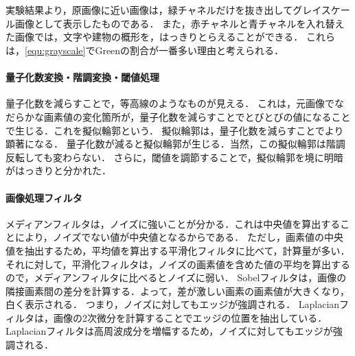 \section{\consideration}
\paragraph{\kadaiaa}
実験結果より，原画像に近い画像は，緑チャネルだけを抜き出してグレイスケール画像として表示したものである．
また，赤チャネルと青チャネルを入れ替えた画像では，文字や建物の概形を，はっきりとらえることができる．
これらは，\eqref{equ:grayscale}でGreenの割合が一番多い理由と考えられる．
\paragraph{量子化数変換・階調変換・閾値処理}
量子化数を減らすことで，等高線のようなものが見える．
これは，元画像でなだらかな画素値の変化箇所が，量子化数を減らすことでとびとびの値になることで生じる．これを擬似輪郭という．
擬似輪郭は，量子化数を減らすことでより顕著になる．
量子化数が減ると擬似輪郭が生じる．当然，この擬似輪郭は階調反転しても変わらない．
さらに，閾値を調節することで，擬似輪郭を境に明暗がはっきりと分かれた．
\paragraph{画像処理フィルタ}
メディアンフィルタは，ノイズに強いことが分かる．これは中央値を算出することにより，ノイズでない値が中央値となるからである．
ただし，画素値の中央値を抽出するため，平均値を算出する平滑化フィルタに比べて，計算量が多い．
それに対して，平滑化フィルタは，ノイズの画素値を含めた値の平均を算出するので，メディアンフィルタに比べるとノイズに弱い．
Sobelフィルタは，画像の隣接画素間の差分を計算する．よって，差が激しい画素の画素値が大きくなり，白く表示される．
つまり，ノイズに対してもエッジが強調される．
Laplacianフィルタは，画像の2次微分を計算することでエッジの位置を抽出している．Laplacianフィルタは高周波成分を増幅するため，ノイズに対してもエッジが強調される．

